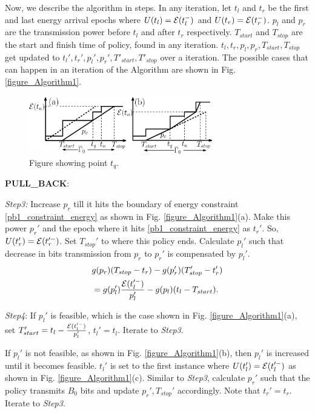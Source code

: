Now, we describe the algorithm in steps. In any iteration, let $t_{l}$ and $t_{r}$ be the first and last energy arrival epochs where $U(t_l)=\mathcal{E}(t_l^-)$ and $U(t_r)=\mathcal{E}(t_r^-)$. $p_l$ and $p_r$ are the transmission power before $t_l$ and after $t_r$ respectively. $T_{start}$ and $T_{stop}$ are the start and finish time of policy, found in any iteration. $t_l, t_r, p_l, p_r, T_{start}, T_{stop}$ get updated to $t_l', t_r', p_l', p_r', T'_{start}, T'_{stop}$ over a iteration. 
The possible cases that can happen in an iteration of the Algorithm are shown in Fig. \ref{figure_Algorithm1}.
\begin{figure}
\centering
  \centerline{\includegraphics[width=8cm]{straight.eps}}
\caption{Figure showing point $t_q$.}\label{straight}
\end{figure}




\textbf{PULL\_BACK}:

\textit{Step3:} Increase $p_r$ till it hits the boundary of energy constraint \eqref{pb1_constraint_energy} as shown in Fig. \ref{figure_Algorithm1}(a). Make this power $p_r'$ and the epoch where it hits \eqref{pb1_constraint_energy} as $t_r'$. So, $U(t_r') = \mathcal{E}(t_r'^-)$. Set $T_{stop}'$ to where this policy ends. Calculate $p_l'$ such that decrease in bits transmission from $p_r$ to $p_r'$ is compensated by $p_l'$.
\begin{align}
&\nonumber g(p_r)(T_{stop}-t_r)-g(p_r')(T_{stop}'-t_r')\\
&=g(p_l')\frac{\ETx(t_l'^-)}{p_l'}-g(p_l)(t_l-T_{start}).
\label{eq_example1}
\end{align}

\textit{Step4}: If $p_l'$ is feasible, which is the case shown in Fig. \ref{figure_Algorithm1}(a), set $T_{start}'=t_l-\frac{\mathcal{E}(t_l'^-)}{p_l'}$, $t_l'=t_l$. Iterate to \textit{Step3}. 

If $p_l'$ is not feasible, as shown in Fig. \ref{figure_Algorithm1}(b), then $p_l'$ is increased until it becomes feasible. $t_l'$ is set to the first instance where $U(t_l') = \mathcal{E}(t_l'^-)$ as shown in Fig. \ref{figure_Algorithm1}(c). Similar to \textit{Step3}, calculate $p_r'$ such that the policy transmits $B_0$ bits and update $p_r',T_{stop}'$ accordingly. Note that $t_r'=t_r$. Iterate to \textit{Step3}.




